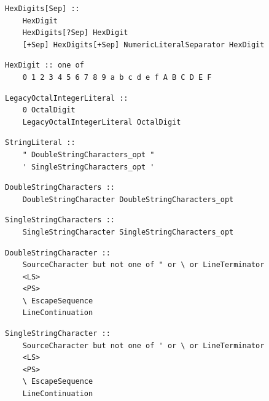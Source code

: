 \noindent\textbf{\texttt{}}\par
\begin{lstlisting}
HexDigits[Sep] ::
    HexDigit
    HexDigits[?Sep] HexDigit
    [+Sep] HexDigits[+Sep] NumericLiteralSeparator HexDigit
\end{lstlisting}

\noindent\textbf{\texttt{}}\par
\begin{lstlisting}
HexDigit :: one of
    0 1 2 3 4 5 6 7 8 9 a b c d e f A B C D E F
\end{lstlisting}

\noindent\textbf{\texttt{}}\par
\begin{lstlisting}
LegacyOctalIntegerLiteral ::
    0 OctalDigit
    LegacyOctalIntegerLiteral OctalDigit
\end{lstlisting}

\noindent\textbf{\texttt{}}\par
\begin{lstlisting}
StringLiteral ::
    " DoubleStringCharacters_opt "
    ' SingleStringCharacters_opt '
\end{lstlisting}

\noindent\textbf{\texttt{}}\par
\begin{lstlisting}
DoubleStringCharacters ::
    DoubleStringCharacter DoubleStringCharacters_opt
\end{lstlisting}

\noindent\textbf{\texttt{}}\par
\begin{lstlisting}
SingleStringCharacters ::
    SingleStringCharacter SingleStringCharacters_opt
\end{lstlisting}

\noindent\textbf{\texttt{}}\par
\begin{lstlisting}
DoubleStringCharacter ::
    SourceCharacter but not one of " or \ or LineTerminator
    <LS>
    <PS>
    \ EscapeSequence
    LineContinuation
\end{lstlisting}

\noindent\textbf{\texttt{}}\par
\begin{lstlisting}
SingleStringCharacter ::
    SourceCharacter but not one of ' or \ or LineTerminator
    <LS>
    <PS>
    \ EscapeSequence
    LineContinuation
\end{lstlisting}

